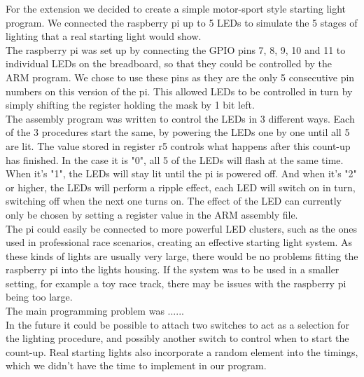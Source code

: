 For the extension we decided to create a simple motor-sport style starting light program. We connected the raspberry pi up to 5 LEDs to simulate the 5 stages of lighting that a real starting light would show. 
~\\

The raspberry pi was set up by connecting the GPIO pins 7, 8, 9, 10 and 11 to individual LEDs on the breadboard, so that they could be controlled by the ARM program. We chose to use these pins as they are the only 5 consecutive pin numbers on this version of the pi. This allowed LEDs to be controlled in turn by simply shifting the register holding the mask by 1 bit left. 
~\\

The assembly program was written to control the LEDs in 3 different ways. Each of the 3 procedures start the same, by powering the LEDs one by one until all 5 are lit. The value stored in register r5 controls what happens after this count-up has finished. In the case it is "0", all 5 of the LEDs will flash at the same time. When it's "1", the LEDs will stay lit until the pi is powered off. And when it's "2" or higher, the LEDs will perform a ripple effect, each LED will switch on in turn, switching off when the next one turns on. The effect of the LED can currently only be chosen by setting a register value in the ARM assembly file. 
~\\

The pi could easily be connected to more powerful LED clusters, such as the ones used in professional race scenarios, creating an effective starting light system. As these kinds of lights are usually very large, there would be no problems fitting the raspberry pi into the lights housing. If the system was to be used in a smaller setting, for example a toy race track, there may be issues with the raspberry pi being too large.
~\\

The main programming problem was ......
~\\

In the future it could be possible to attach two switches to act as a selection for the lighting procedure, and possibly another switch to control when to start the count-up. Real starting lights also incorporate a random element into the timings, which we didn't have the time to implement in our program.